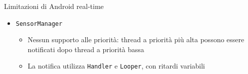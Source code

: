 \begin{frame}{Limitazioni di Android real-time}
{\begin{itemize}
\begin{itemize}
\begin{itemize}
				\item Nessuna garanzia sul tempo di notifica
			\end{itemize}
			\item \texttt{SensorManager}
			\begin{itemize}
				\item Nessun supporto alle priorità: thread a priorità più alta possono essere notificati dopo thread a priorità bassa
				\item La notifica utilizza \texttt{Handler} e \texttt{Looper}, con ritardi variabili
			\end{itemize}
		\end{itemize}
	\end{itemize}}
\end{frame}